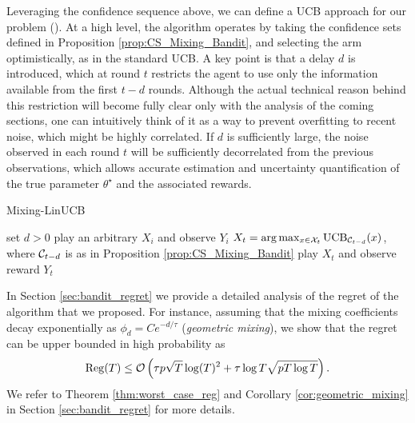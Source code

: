 Leveraging the confidence sequence above, we can define a UCB approach for our problem (). At a high level, the algorithm 
 operates by taking the confidence sets defined in Proposition 
\ref{prop:CS_Mixing_Bandit}, and selecting the arm optimistically, as in the standard UCB. A key point is that a delay 
$d$ is introduced, which at round $t$ restricts the agent to use only the information available from the first $t-d$ 
rounds. Although the actual technical reason behind this restriction will become fully clear only with the analysis of the 
coming sections, one can intuitively think of it as a way to prevent overfitting to recent noise, which might be 
highly correlated. If $d$ is sufficiently large, the noise observed in each round $t$ will 
be sufficiently decorrelated from the previous observations, which allows accurate estimation and uncertainty 
quantification of the true parameter $\theta^\star$ and the associated rewards.  

\begin{algorithm}[!h]
\caption{Mixing-LinUCB}\label{alg::Mixing_LinUCB}
\begin{algorithmic}
\State set $d>0$
\State play an arbitrary $X_i$ and observe $Y_i$
\EndFor
{}
\State  $X_{t} = \arg\max_{x \in \mathcal{X}_t} \mathrm{UCB}_{\mathcal{C}_{t-d}}(x)$, where $\mathcal{C}_{t-d}$ is as in Proposition \ref{prop:CS_Mixing_Bandit}
\State play $X_t$ and observe reward $Y_t$
\EndFor
\end{algorithmic}
\end{algorithm} 

In Section \ref{sec:bandit_regret} we provide a detailed analysis of the regret of the algorithm that we proposed. For instance, assuming that the mixing coefficients decay exponentially as $\phi_d = C e^{-d/\tau}$ (\emph{geometric mixing}), we show that the regret can be upper bounded in high probability as  \[\mathrm{Reg}(T) \leq \mathcal{O}\left(\tau p\sqrt{T}\log(T)^2+\tau \log T\sqrt{pT \log T}\right).\]
We refer to Theorem \ref{thm:worst_case_reg} and Corollary \ref{cor:geometric_mixing} in Section \ref{sec:bandit_regret} for more details.